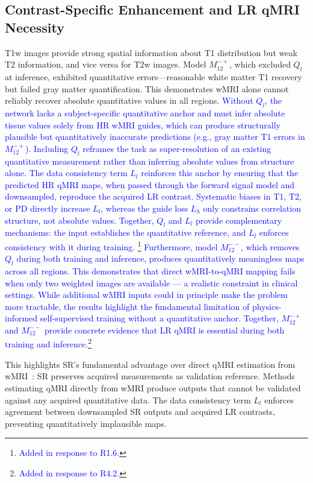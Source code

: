 \documentclass[journal,twoside,web]{ieeecolor}
\newcommand{\added}[1]{\textcolor{blue}{#1}}      %
\begin{document}
\subsection{Contrast-Specific Enhancement and LR qMRI Necessity}
T1w images provide strong spatial information about T1 distribution but weak T2 information, and vice versa for T2w images. Model $M_{12}^{-+}$, which excluded $Q_l$ at inference, exhibited quantitative errors—reasonable white matter T1 recovery but failed gray matter quantification. This demonstrates wMRI alone cannot reliably recover absolute quantitative values in all regions. \added{Without $Q_l$, the network lacks a 
subject-specific quantitative anchor and must infer absolute tissue 
values solely from HR wMRI guides, which can produce structurally 
plausible but quantitatively inaccurate predictions (e.g., gray matter 
T1 errors in $M_{12}^{-+}$). Including $Q_l$ reframes the task as 
super-resolution of an existing quantitative measurement rather than 
inferring absolute values from structure alone. The data consistency 
term $L_l$ reinforces this anchor by ensuring that the predicted HR 
qMRI maps, when passed through the forward signal model and downsampled, 
reproduce the acquired LR contrast. Systematic 
biases in T1, T2, or PD directly increase $L_l$, whereas the guide 
loss $L_h$ only constrains correlation structure, not absolute values. 
Together, $Q_l$ and $L_l$ provide complementary mechanisms: the input 
establishes the quantitative reference, and $L_l$ enforces consistency 
with it during training. \footnote{\textcolor{blue}{Added in response to R1.6.}}}
\added{Furthermore, model $M_{12}^{--}$, which removes $Q_l$ during 
both training and inference, produces quantitatively meaningless maps 
across all regions. This demonstrates that direct wMRI-to-qMRI mapping 
fails when only two weighted images are available --- a realistic 
constraint in clinical settings. While additional wMRI inputs could 
in principle make the problem more tractable, the results highlight 
the fundamental limitation of physics-informed self-supervised training 
without a quantitative anchor. Together, $M_{12}^{-+}$ and 
$M_{12}^{--}$ provide concrete evidence that LR qMRI is essential 
during both training and inference.\footnote{\textcolor{blue}{Added in response to R4.2.}}}

This highlights SR's fundamental advantage over direct qMRI estimation from wMRI~\cite{b5,b6,b7}: SR preserves acquired measurements as validation reference. Methods estimating qMRI directly from wMRI produce outputs that cannot be validated against any acquired quantitative data. The data consistency term $L_l$ enforces agreement between downsampled SR outputs and acquired LR contrasts, preventing quantitatively implausible maps.
\end{document}
